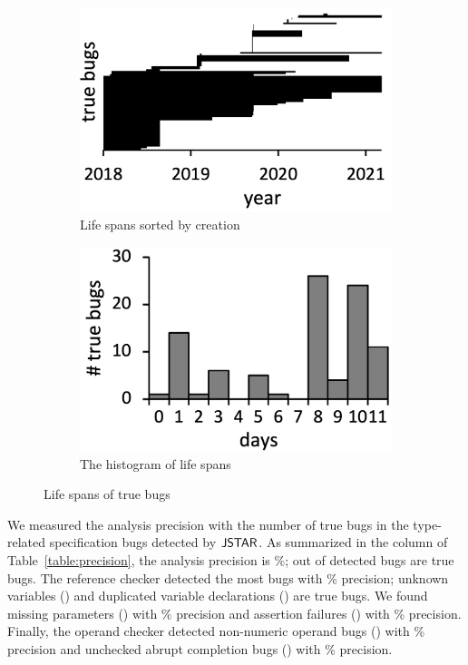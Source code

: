 \begin{figure}
  \centering
  \begin{subfigure}[b]{0.24\textwidth}
    \includegraphics[width=\textwidth]{img/life-sort}
    \caption{Life spans sorted by creation}
  \end{subfigure}
  \begin{subfigure}[b]{0.24\textwidth}
    \includegraphics[width=\textwidth]{img/life-hist}
    \caption{The histogram of life spans}
  \end{subfigure}
  \caption{Life spans of true bugs}
  \vspace*{-1.5em}
  \label{fig:life}
\end{figure}

We measured the analysis precision with the number of true bugs in
the type-related specification bugs detected by $\tool$.
As summarized in the  column of Table~\ref{table:precision}, the analysis precision
is \%;  out of  detected bugs are true bugs.
The reference checker detected the most bugs with \% precision;
 unknown variables () and
 duplicated variable declarations () are true bugs.
We found  missing parameters () with \% precision and
 assertion failures () with \% precision.
Finally, the operand checker detected
 non-numeric operand bugs () with \% precision and
 unchecked abrupt completion bugs () with \% precision.

